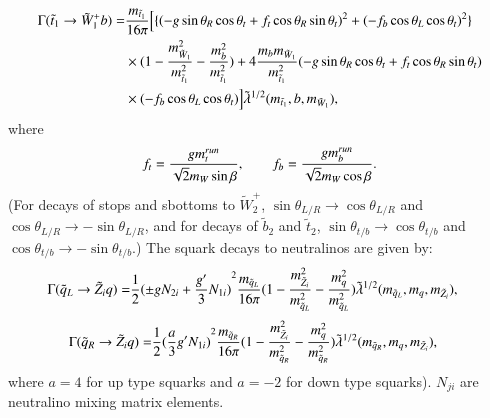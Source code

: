 \documentclass[final,3p,times]{elsarticle}
\begin{document}
\begin{equation}\label{t1bch1}
\begin{aligned}
\Gamma(\tilde{t}_{1} \rightarrow \tilde{W}_{1}^+ b ) = & {m_{\tilde{t}_1} \over 16\pi} \Big[\{ ({-g\sin\theta_R\cos\theta_t + f_t\cos\theta_R\sin\theta_t})^2 + ({-f_b\cos\theta_L\cos\theta_t})^2\} \\ & \times (1 - {m_{\tilde{W}_{1}}^2 \over m_{\tilde{t}_{1}}^2 } - {m_{b}^2 \over m_{\tilde{t}_{1}}^2 } ) + 4 {m_b m_{\tilde{W}_1} \over m_{\tilde{t}_1}^2 }({-g\sin\theta_R\cos\theta_t + f_t\cos\theta_R\sin\theta_t})\\ & \times (-f_{b}\cos\theta_L\cos\theta_t)\Big]  \tilde{\lambda}^{1/2}(m_{\tilde{t}_1},b,m_{\tilde{W}_1}) ,
\end{aligned}
\end{equation} 
where 
\begin{equation} \label{ftfb}
f_t = {g m_t^{run} \over \sqrt{2}m_W\sin\beta }, \quad \quad f_b = {g m_b^{run} \over \sqrt{2}m_W\cos\beta }.
\end{equation}
(For decays of stops and sbottoms to $\tilde{W}_{2}^+$, $\sin
\theta_{L/R}\rightarrow \cos \theta_{L/R}$ and $\cos \theta_{L/R}\rightarrow
-\sin \theta_{L/R}$, and for decays of $\tilde{b}_2$ 
and $\tilde{t}_2$, $\sin \theta_{t/b} \rightarrow
\cos \theta_{t/b}$ and $\cos \theta_{t/b}\rightarrow -\sin \theta_{t/b}$.)
The squark decays to neutralinos are given by:
\begin{equation} \label{qLqneut}
\begin{aligned}
\Gamma(\tilde{q}_L \rightarrow \tilde{Z}_i q ) = & {1 \over 2} {(\pm g N_{2i} + {g' \over 3} N_{1i})}^2 {m_{\tilde{q}_L}  \over 16\pi} (1 - {m_{\tilde{Z}_i}^2 \over m_{\tilde{q}_L}^2 } - {m_{q}^2 \over m_{\tilde{q}_L}^2 } ) \tilde{\lambda}^{1/2}(m_{\tilde{q}_L}, m_q, m_{\tilde{Z}_i}),
\end{aligned}
\end{equation} 
\begin{equation} \label{qRqneut}
\begin{aligned}
\Gamma(\tilde{q}_R \rightarrow \tilde{Z}_i q ) = & {1 \over 2} {( {a \over 3} g'  N_{1i})}^2 {m_{\tilde{q}_R}  \over 16\pi} (1 - {m_{\tilde{Z}_i}^2 \over m_{\tilde{q}_R}^2 } - {m_{q}^2 \over m_{\tilde{q}_R}^2 } ) \tilde{\lambda}^{1/2}(m_{\tilde{q}_R}, m_q, m_{\tilde{Z}_i}),
\end{aligned}
\end{equation}
where $a = 4$ for up type squarks and $a = -2$ for down type squarks). $N_{ji}$ are neutralino mixing matrix elements.
\end{document}
